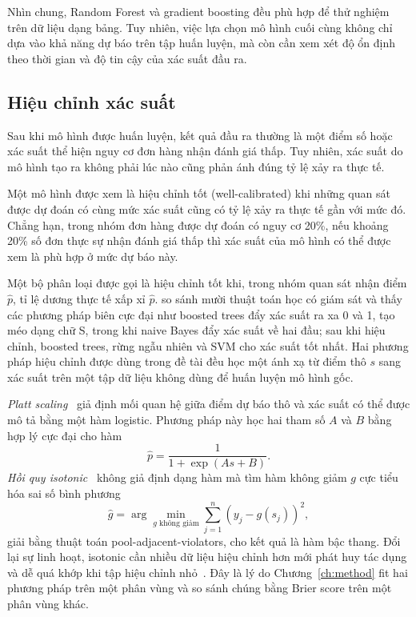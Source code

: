 \documentclass[12pt,a4paper]{report}
\begin{document}
Nhìn chung, Random Forest và gradient boosting đều phù hợp để thử nghiệm trên dữ liệu dạng bảng. Tuy nhiên, việc lựa chọn mô hình cuối cùng không chỉ dựa vào khả năng dự báo trên tập huấn luyện, mà còn cần xem xét độ ổn định theo thời gian và độ tin cậy của xác suất đầu ra.

\subsection{Hiệu chỉnh xác suất}\label{sec:th-calibration}

Sau khi mô hình được huấn luyện, kết quả đầu ra thường là một điểm số hoặc xác suất thể hiện nguy cơ đơn hàng nhận đánh giá thấp. Tuy nhiên, xác suất do mô hình tạo ra không phải lúc nào cũng phản ánh đúng tỷ lệ xảy ra thực tế.

Một mô hình được xem là hiệu chỉnh tốt (well-calibrated) khi những quan sát được dự đoán có cùng mức xác suất cũng có tỷ lệ xảy ra thực tế gần với mức đó. Chẳng hạn, trong nhóm đơn hàng được dự đoán có nguy cơ 20\%, nếu khoảng 20\% số đơn thực sự nhận đánh giá thấp thì xác suất của mô hình có thể được xem là phù hợp ở mức dự báo này.

Một bộ phân loại được gọi là hiệu chỉnh tốt khi, trong nhóm quan sát nhận điểm $\hat p$, tỉ lệ dương thực tế xấp xỉ $\hat p$. \textcite{niculescumizil2005} so sánh mười thuật toán học có giám sát và thấy các phương pháp biên cực đại như boosted trees đẩy xác suất ra xa 0 và 1, tạo méo dạng chữ S, trong khi naive Bayes đẩy xác suất về hai đầu; sau khi hiệu chỉnh, boosted trees, rừng ngẫu nhiên và SVM cho xác suất tốt nhất. Hai phương pháp hiệu chỉnh được dùng trong đề tài đều học một ánh xạ từ điểm thô $s$ sang xác suất trên một tập dữ liệu không dùng để huấn luyện mô hình gốc.

\emph{Platt scaling}~\parencite{platt1999} giả định mối quan hệ giữa điểm dự báo thô và xác suất có thể được mô tả bằng một hàm logistic. Phương pháp này học hai tham số $A$ và $B$ bằng hợp lý cực đại cho hàm
\begin{equation}\label{eq:th-platt}
  \hat{p} = \frac{1}{1 + \exp(A s + B)} .
\end{equation}
\emph{Hồi quy isotonic}~\parencite{zadrozny2002} không giả định dạng hàm mà tìm hàm không giảm $g$ cực tiểu hóa sai số bình phương
\begin{equation}\label{eq:th-isotonic}
  \hat{g} = \arg\min_{g \text{ không giảm}} \sum_{j=1}^{n} \left( y_j - g(s_j) \right)^2 ,
\end{equation}
giải bằng thuật toán pool-adjacent-violators, cho kết quả là hàm bậc thang. Đổi lại sự linh hoạt, isotonic cần nhiều dữ liệu hiệu chỉnh hơn mới phát huy tác dụng và dễ quá khớp khi tập hiệu chỉnh nhỏ~\parencite{niculescumizil2005}. Đây là lý do Chương~\ref{ch:method} fit hai phương pháp trên một phân vùng và so sánh chúng bằng Brier score trên một phân vùng khác.
\end{document}
